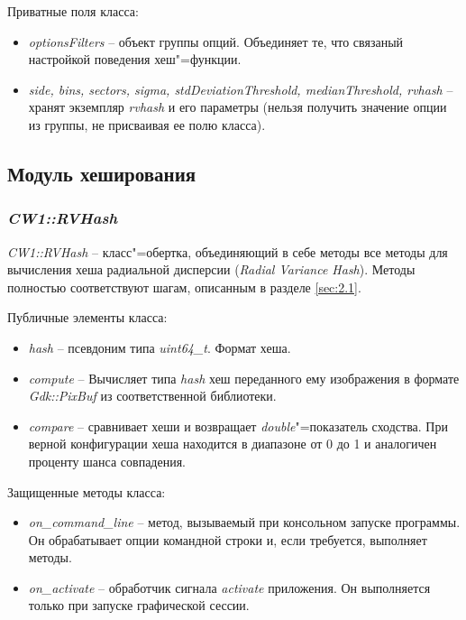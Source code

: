 Приватные поля класса:

\begin{itemize}
    \item \textit{optionsFilters} -- объект группы опций. Объединяет те, что
          связаный настройкой поведения хеш"=функции.
    \item \textit{side, bins, sectors, sigma, stdDeviationThreshold,
          medianThreshold, rvhash} -- хранят экземпляр \textit{rvhash} и его
          параметры (нельзя получить значение опции из группы, не присваивая ее
          полю класса).
\end{itemize}

\subsection*{Модуль хеширования}

\subsubsection{\textit{CW1::RVHash}}

\textit{CW1::RVHash} -- класс"=обертка, объединяющий в себе методы все методы
для вычисления хеша радиальной дисперсии (\textit{Radial Variance Hash}). Методы
полностью соответствуют шагам, описанным в разделе \ref{sec:2.1}. 

Публичные элементы класса:

\begin{itemize}
    \item \textit{hash} -- псевдоним типа \textit{uint64\_t}. Формат хеша.
    \item \textit{compute} -- Вычисляет типа \textit{hash} хеш переданного ему
          изображения в формате \textit{Gdk::PixBuf} из соответственной
          библиотеки.
    \item \textit{compare} -- сравнивает хеши и возвращает
          \textit{double}"=показатель сходства. При верной конфигурации хеша
          находится в диапазоне от 0 до 1 и аналогичен проценту шанса
          совпадения.
\end{itemize}

Защищенные методы класса:

\begin{itemize}
    \item \textit{on\_command\_line} -- метод, вызываемый при консольном запуске
          программы. Он обрабатывает опции командной строки и, если требуется,
          выполняет методы.
    \item \textit{on\_activate} -- обработчик сигнала \textit{activate}
          приложения. Он выполняется только при запуске графической сессии.
\end{itemize}

